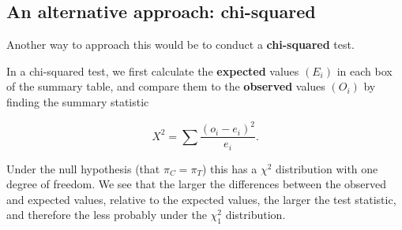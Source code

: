 \documentclass[
  openany]{book}
\theoremstyle{definition}
\theoremstyle{definition}
\theoremstyle{definition}
\theoremstyle{definition}
\theoremstyle{remark}
\begin{document}
\hypertarget{an-alternative-approach-chi-squared}{%
\subsection{An alternative approach: chi-squared}\label{an-alternative-approach-chi-squared}}

Another way to approach this would be to conduct a \textbf{chi-squared} test.

In a chi-squared test, we first calculate the \textbf{expected} values \(\left(E_i\right)\) in each box of the summary table, and compare them to the \textbf{observed} values \(\left(O_i\right)\) by finding the summary statistic

\[ X^2 = \sum \frac{\left(o_i - e_i\right)^2}{e_i}.\]

Under the null hypothesis (that \(\pi_C = \pi_T\)) this has a \(\chi^2\) distribution with one degree of freedom. We see that the larger the differences between the observed and expected values, relative to the expected values, the larger the test statistic, and therefore the less probably under the \(\chi^2_1\) distribution.
\end{document}
